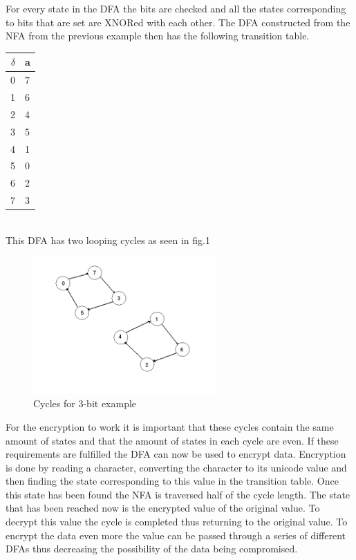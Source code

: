\documentclass[a4paper,11pt,titlepage]{article}
\begin{document}
For every state in the DFA the bits are checked and all the states corresponding to bits that are set are XNORed with each other. The DFA constructed from the NFA from the previous example then has the following transition table.
\newline\\
\begin{tabular}{|r|l|}
$\delta$ & a\\
\hline
0 & 7\\
1 & 6\\
2 & 4\\
3 & 5\\
4 & 1\\
5 & 0\\
6 & 2\\
7 & 3\\
\end{tabular}
\newline\\

This DFA has two looping cycles as seen in fig.1

\begin{figure}[htbp]
   \centering
   \includegraphics[width=7cm]{cycles.png}
   \caption{Cycles for 3-bit example}
   \label{Figure:figex}
\end{figure}

For the encryption to work it is important that these cycles contain the same amount of states and that the amount of states in each cycle are even. If these requirements are fulfilled the DFA can now be used to encrypt data. Encryption is done by reading a character, converting the character to its unicode value and then finding the state corresponding to this value in the transition table. Once this state has been found the NFA is traversed half of the cycle length. The state that has been reached now is the encrypted value of the original value. To decrypt this value the cycle is completed thus returning to the original value. To encrypt the data even more the value can be passed through a series of different DFAs thus decreasing the possibility of the data being compromised.
\end{document}
